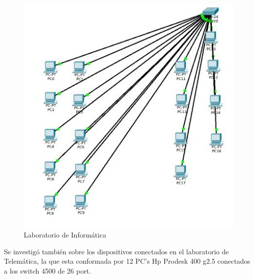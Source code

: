 \documentclass{article}
\begin{document}
\begin{figure}[h!]
\centering
\includegraphics[scale=0.4]{Informatica.jpg}
\caption{Laboratorio de Informática}
\label{fig:Infor}
\end{figure}

Se investigó también sobre los dispositivos conectados en el laboratorio de Telemática, la que esta conformada por 12 PC's Hp Prodesk 400 g2.5 conectados a los switch 4500 de 26 port.
\newpage
\end{document}
